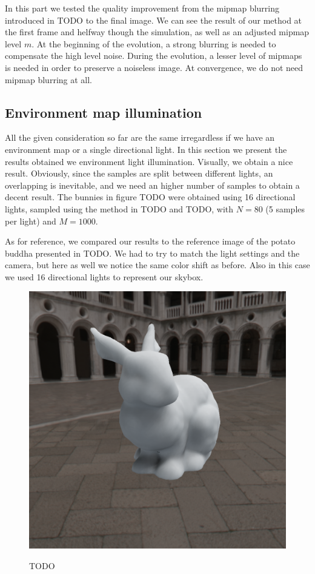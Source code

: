 In this part we tested the quality improvement from the mipmap blurring introduced in TODO to the final image. We can see the result of our method at the first frame and helfway though the simulation, as well as an adjusted mipmap level $m$. At the beginning of the evolution, a strong blurring is needed to compensate the high level noise. During the evolution, a lesser level of mipmaps is needed in order to preserve a noiseless image. At convergence, we do not need mipmap blurring at all. 


\subsection{Environment map illumination}

All the given consideration so far are the same irregardless if we have an environment map or a single directional light. In this section we present the results obtained we environment light illumination. Visually, we obtain a nice result. Obviously, since the samples are split between different lights, an overlapping is inevitable, and we need an higher number of samples to obtain a decent result. The bunnies in figure TODO were obtained using 16 directional lights, sampled using the method in TODO and TODO, with $N = 80$ (5 samples per light) and $M = 1000$. 

As for reference, we compared our results to the reference image of the potato buddha presented in TODO. We had to try to match the light settings and the camera, but here as well we notice the same color shift as before. Also in this case we used 16 directional lights to represent our skybox.

\begin{figure}
\centering
\includegraphics[width=0.7 \linewidth]{images/results/bunny_env_80_1000_nobias.png}
\label{fig:bunnyenv1}
\caption{TODO}
\end{figure}

